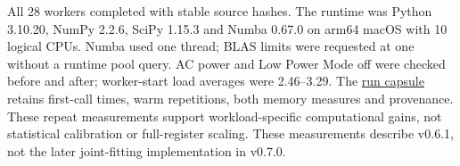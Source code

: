 All 28 workers completed with stable source hashes. The runtime was Python
3.10.20, NumPy 2.2.6, SciPy 1.15.3 and Numba 0.67.0 on arm64 macOS with
10 logical CPUs. Numba used one thread; BLAS limits were requested at one
without a runtime pool query. AC power and Low Power Mode off were checked
before and after; worker-start load averages were 2.46--3.29.
The \href{https://github.com/bvilhjal/ltpred/tree/main/benchmarks/results/2026-09-09-time-memory-v061-rerun}{run capsule}
retains first-call times, warm repetitions, both memory measures and provenance.
These repeat measurements support workload-specific computational gains,
not statistical calibration or full-register scaling. These measurements
describe v0.6.1, not the later joint-fitting implementation in v0.7.0.

